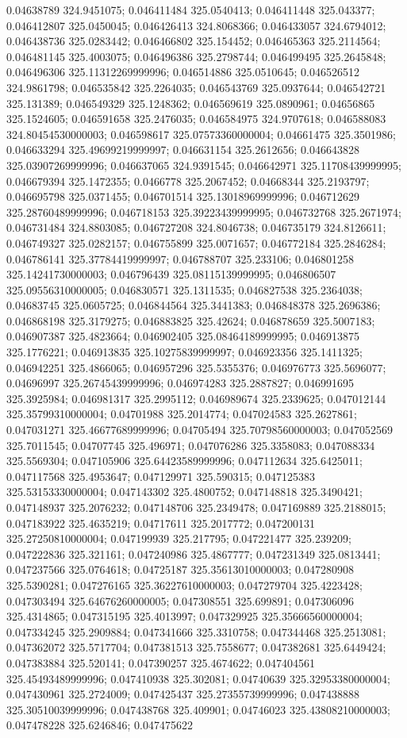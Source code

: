 0.04638789 324.9451075; 0.046411484 325.0540413; 0.046411448 325.043377; 0.046412807 325.0450045; 0.046426413 324.8068366; 0.046433057 324.6794012; 0.046438736 325.0283442; 0.046466802 325.154452; 0.046465363 325.2114564; 0.046481145 325.4003075; 0.046496386 325.2798744; 0.046499495 325.2645848; 0.046496306 325.11312269999996; 0.046514886 325.0510645; 0.046526512 324.9861798; 0.046535842 325.2264035; 0.046543769 325.0937644; 0.046542721 325.131389; 0.046549329 325.1248362; 0.046569619 325.0890961; 0.04656865 325.1524605; 0.046591658 325.2476035; 0.046584975 324.9707618; 0.046588083 324.80454530000003; 0.046598617 325.07573360000004; 0.04661475 325.3501986; 0.046633294 325.49699219999997; 0.046631154 325.2612656; 0.046643828 325.03907269999996; 0.046637065 324.9391545; 0.046642971 325.11708439999995; 0.046679394 325.1472355; 0.0466778 325.2067452; 0.04668344 325.2193797; 0.046695798 325.0371455; 0.046701514 325.13018969999996; 0.046712629 325.28760489999996; 0.046718153 325.39223439999995; 0.046732768 325.2671974; 0.046731484 324.8803085; 0.046727208 324.8046738; 0.046735179 324.8126611; 0.046749327 325.0282157; 0.046755899 325.0071657; 0.046772184 325.2846284; 0.046786141 325.37784419999997; 0.046788707 325.233106; 0.046801258 325.14241730000003; 0.046796439 325.08115139999995; 0.046806507 325.09556310000005; 0.046830571 325.1311535; 0.046827538 325.2364038; 0.04683745 325.0605725; 0.046844564 325.3441383; 0.046848378 325.2696386; 0.046868198 325.3179275; 0.046883825 325.42624; 0.046878659 325.5007183; 0.046907387 325.4823664; 0.046902405 325.08464189999995; 0.046913875 325.1776221; 0.046913835 325.10275839999997; 0.046923356 325.1411325; 0.046942251 325.4866065; 0.046957296 325.5355376; 0.046976773 325.5696077; 0.04696997 325.26745439999996; 0.046974283 325.2887827; 0.046991695 325.3925984; 0.046981317 325.2995112; 0.046989674 325.2339625; 0.047012144 325.35799310000004; 0.04701988 325.2014774; 0.047024583 325.2627861; 0.047031271 325.46677689999996; 0.04705494 325.70798560000003; 0.047052569 325.7011545; 0.04707745 325.496971; 0.047076286 325.3358083; 0.047088334 325.5569304; 0.047105906 325.64423589999996; 0.047112634 325.6425011; 0.047117568 325.4953647; 0.047129971 325.590315; 0.047125383 325.53153330000004; 0.047143302 325.4800752; 0.047148818 325.3490421; 0.047148937 325.2076232; 0.047148706 325.2349478; 0.047169889 325.2188015; 0.047183922 325.4635219; 0.04717611 325.2017772; 0.047200131 325.27250810000004; 0.047199939 325.217795; 0.047221477 325.239209; 0.047222836 325.321161; 0.047240986 325.4867777; 0.047231349 325.0813441; 0.047237566 325.0764618; 0.04725187 325.35613010000003; 0.047280908 325.5390281; 0.047276165 325.36227610000003; 0.047279704 325.4223428; 0.047303494 325.64676260000005; 0.047308551 325.699891; 0.047306096 325.4314865; 0.047315195 325.4013997; 0.047329925 325.35666560000004; 0.047334245 325.2909884; 0.047341666 325.3310758; 0.047344468 325.2513081; 0.047362072 325.5717704; 0.047381513 325.7558677; 0.047382681 325.6449424; 0.047383884 325.520141; 0.047390257 325.4674622; 0.047404561 325.45493489999996; 0.047410938 325.302081; 0.04740639 325.32953380000004; 0.047430961 325.2724009; 0.047425437 325.27355739999996; 0.047438888 325.30510039999996; 0.047438768 325.409901; 0.04746023 325.43808210000003; 0.047478228 325.6246846; 0.047475622 